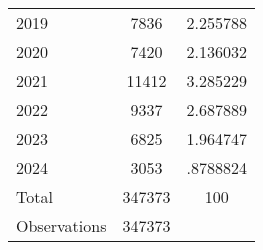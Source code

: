 {\begin{longtable}{l*{1}{cc}}
2019                &        7836&    2.255788\\
2020                &        7420&    2.136032\\
2021                &       11412&    3.285229\\
2022                &        9337&    2.687889\\
2023                &        6825&    1.964747\\
2024                &        3053&    .8788824\\
Total               &      347373&         100\\
\midrule
Observations        &      347373&            \\
\bottomrule
\end{longtable}
\label{tab:summary_year}
}
